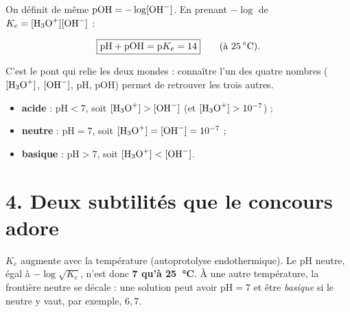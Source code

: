 \documentclass[11pt,a4paper]{article}
\begin{document}
On définit de même $\mathrm{pOH} = -\log[\ce{OH-}]$. En prenant $-\log$ de $K_e = [\ce{H3O+}][\ce{OH-}]$ :

\begin{formule}
\[ \boxed{\mathrm{pH} + \mathrm{pOH} = \mathrm{p}K_e = 14} \qquad(\text{à \SI{25}{\celsius}}). \]
\end{formule}

C'est le pont qui relie les deux mondes : connaître l'un des quatre nombres
($[\ce{H3O+}]$, $[\ce{OH-}]$, $\mathrm{pH}$, $\mathrm{pOH}$) permet de retrouver les trois autres.

\begin{center}
\end{center}

\begin{regle}
\begin{itemize}[leftmargin=1.5em,topsep=1pt,itemsep=1pt]
  \item \textbf{acide} : $\mathrm{pH}<7$, soit $[\ce{H3O+}]>[\ce{OH-}]$ (et $[\ce{H3O+}]>10^{-7}$) ;
  \item \textbf{neutre} : $\mathrm{pH}=7$, soit $[\ce{H3O+}]=[\ce{OH-}]=10^{-7}$ ;
  \item \textbf{basique} : $\mathrm{pH}>7$, soit $[\ce{H3O+}]<[\ce{OH-}]$.
\end{itemize}
\end{regle}

\section*{4. Deux subtilités que le concours adore}

\begin{attention}
$K_e$ augmente avec la température (autoprotolyse endothermique). Le pH neutre, égal à
$-\log\sqrt{K_e}$, n'est donc \textbf{7 qu'à \SI{25}{\celsius}}. À une autre température, la frontière neutre
se décale : une solution peut avoir $\mathrm{pH}=7$ et être \emph{basique} si le neutre y vaut, par exemple,
$6{,}7$.
\end{attention}
\end{document}
